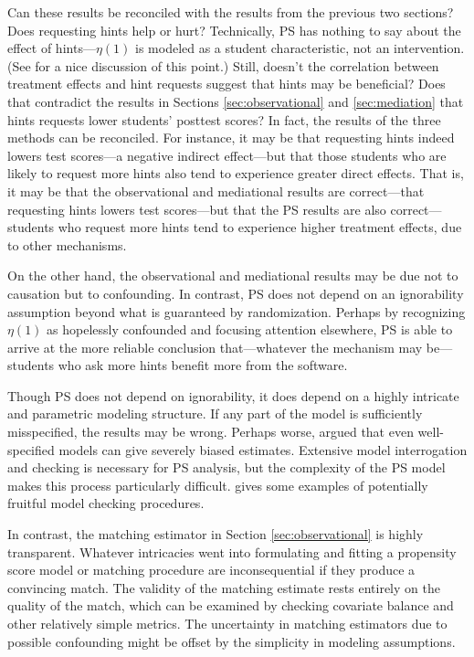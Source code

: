 \documentclass{article}
\begin{document}
Can these results be reconciled with the results from the previous two
sections?
Does requesting hints help or hurt?
Technically, PS has nothing to say about the effect of hints---$\eta(1)$
is modeled as a student characteristic, not an intervention.
(See \citealt{jin2008principal} for a nice discussion of this point.)
Still, doesn't the correlation between treatment effects and hint
requests suggest that hints may be beneficial?
Does that contradict the results in Sections \ref{sec:observational}
and \ref{sec:mediation} that hints requests lower students' posttest
scores?
In fact, the results of the three methods can be reconciled.
For instance, it may be that requesting hints indeed lowers test
scores---a negative indirect effect---but that those students who are
likely to request more hints also tend to experience greater direct
effects.
That is, it may be that the observational and mediational results are
correct---that requesting hints lowers test scores---but that the PS
results are also correct---students who request more hints tend to
experience higher treatment effects, due to other mechanisms.

On the other hand, the observational and mediational results may be
due not to causation but to confounding.
In contrast, PS does not depend on an ignorability assumption beyond
what is guaranteed by randomization.
Perhaps by recognizing $\eta(1)$ as hopelessly confounded and focusing
attention elsewhere, PS is able to arrive at the more reliable
conclusion that---whatever the mechanism may be---students who ask
more hints benefit more from the software.

Though PS does not depend on ignorability, it does depend on a highly
intricate and parametric modeling structure.
If any part of the model is sufficiently misspecified, the results may
be wrong.
Perhaps worse, \citet{feller2016principal} argued that even well-specified
models can give severely biased estimates.
Extensive model interrogation and checking is necessary for PS
analysis, but the complexity of the PS model makes this process
particularly difficult.
\citet{aoas} gives some examples of potentially fruitful model
checking procedures.

In contrast, the matching estimator in Section \ref{sec:observational}
is highly transparent.
Whatever intricacies went into formulating and fitting a propensity
score model or matching procedure are inconsequential if they produce
a convincing match.
The validity of the matching estimate rests entirely on the quality of
the match, which can be examined by checking covariate balance and
other relatively simple metrics.
The uncertainty in matching estimators due to possible confounding
might be offset by the simplicity in modeling assumptions.
\end{document}
